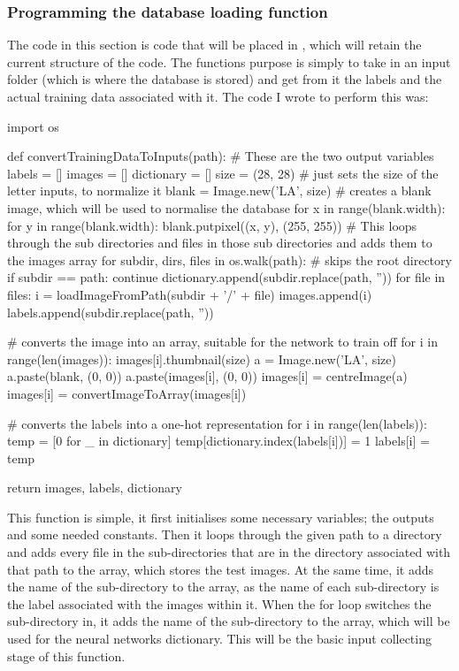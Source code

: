\documentclass{report}
\begin{document}
\subsubsection{Programming the database loading function}
The code in this section is code that will be placed in , which will retain the current structure of the code. The functions purpose is simply to take in an input folder (which is where the database is stored) and get from it the labels and the actual training data associated with it.
\newline
The code I wrote to perform this was:
\begin{python}
import os

def convertTrainingDataToInputs(path):
    # These are the two output variables
    labels = []
    images = []
    dictionary = []
    size = (28, 28)  # just sets the size of the letter inputs, to normalize it
    blank = Image.new('LA', size)  # creates a blank image, which will be used to normalise the database
    for x in range(blank.width):
        for y in range(blank.width):
            blank.putpixel((x, y), (255, 255))
    # This loops through the sub directories and files in those sub directories and adds them to the images array
    for subdir, dirs, files in os.walk(path):
        # skips the root directory
        if subdir == path:
            continue
        dictionary.append(subdir.replace(path, ''))
        for file in files:
            i = loadImageFromPath(subdir + '/' + file)
            images.append(i)
            labels.append(subdir.replace(path, ''))

    # converts the image into an array, suitable for the network to train off
    for i in range(len(images)):
        images[i].thumbnail(size)
        a = Image.new('LA', size)
        a.paste(blank, (0, 0))
        a.paste(images[i], (0, 0))
        images[i] = centreImage(a)
        images[i] = convertImageToArray(images[i])

    # converts the labels into a one-hot representation
    for i in range(len(labels)):
        temp = [0 for _ in dictionary]
        temp[dictionary.index(labels[i])] = 1
        labels[i] = temp

    return images, labels, dictionary
\end{python}
This function is simple, it first initialises some necessary variables; the outputs and some needed constants. Then it loops through the given path to a directory and adds every file in the sub-directories that are in the directory associated with that path to the  array, which stores the test images. At the same time, it adds the name of the sub-directory to the  array, as the name of each sub-directory is the label associated with the images within it. When the for loop switches the sub-directory in, it adds the name of the sub-directory to the  array, which will be used for the neural networks dictionary. This will be the basic input collecting stage of this function. 
\end{document}

